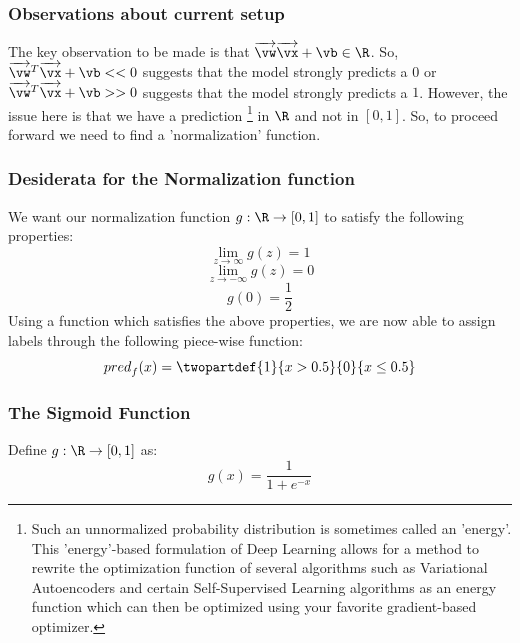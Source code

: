 \begin{enumerate}
    \subsubsection{Observations about current setup}
    The key observation to be made is that $\overrightarrow{\vw} \overrightarrow{\vx} + \vb \in \R$. So, $\overrightarrow{\vw}^T \overrightarrow{\vx} + \vb << 0$ suggests that the model strongly predicts a $0$ or $\overrightarrow{\vw}^T \overrightarrow{\vx} + \vb >> 0$ suggests that the model strongly predicts a $1$. However, the issue here is that we have a prediction \footnote{Such an unnormalized probability distribution is sometimes called an 'energy'. This 'energy'-based formulation of Deep Learning allows for a method to rewrite the optimization function of several algorithms such as Variational Autoencoders and certain Self-Supervised Learning algorithms as an energy function which can then be optimized using your favorite gradient-based optimizer.} in $\R$  and not in $[0, 1]$. So, to proceed forward we need to find a 'normalization' function.
    
    \subsubsection{Desiderata for the Normalization function}
    We want our normalization function $g: \R \to [0, 1]$ to satisfy the following properties:
    $$\lim_{z \to \infty} g(z) = 1$$
    $$\lim_{z \to -\infty} g(z) = 0$$
    $$g(0) = \frac{1}{2}$$ 
    Using a function which satisfies the above properties, we are now able to assign labels through the following piece-wise function:
    $${pred}_f(x) = \twopartdef{1}{x > 0.5}{0}{x \leq 0.5}$$
    
    \subsubsection{The Sigmoid Function}
    Define $g: \R \to [0, 1]$ as:
    $$g(x) = \frac{1}{1 + e^{-x}}$$
    

\end{enumerate}
